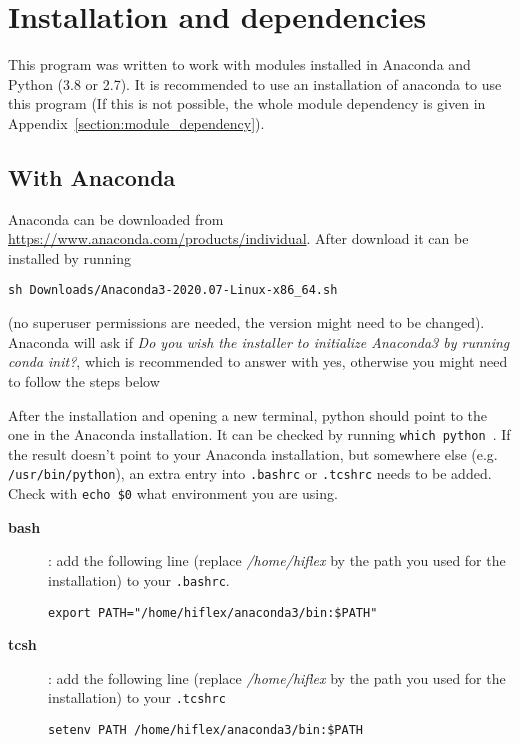 \documentclass[10pt,a4paper]{article}
\begin{document}


\newpage
\section{Installation and dependencies}
\label{Section:installation}

\noindent This program was written to work with modules installed in Anaconda and Python (3.8 or 2.7). It is recommended to use an installation of anaconda to use this program (If this is not possible, the whole module dependency is given in Appendix~\ref{section:module_dependency}).

\subsection{With Anaconda} 
\noindent Anaconda can be downloaded from \url{https://www.anaconda.com/products/individual}. After download it can be installed by running
\begin{lstlisting}[style=base]
sh Downloads/Anaconda3-2020.07-Linux-x86_64.sh
\end{lstlisting}
(no superuser permissions are needed, the version might need to be changed). Anaconda will ask if \textit{Do you wish the installer to initialize Anaconda3 by running conda init?}, which is recommended to answer with yes, otherwise you might need to follow the steps below

After the installation and opening a new terminal, python should point to the one in the Anaconda installation. It can be checked by running \verb|which python|~. %
If the result doesn't point to your Anaconda installation, but somewhere else (e.g. \verb|/usr/bin/python|), an extra entry into \verb|.bashrc| or \verb|.tcshrc| needs to be added. Check with \verb|echo $0| what environment you are using.
\begin{description}
  \item[\textbf{bash}]: add the following line (replace \textit{/home/hiflex} by the path you used for the installation) to your \verb|.bashrc|. %
    \begin{lstlisting}[style=base]
export PATH="/home/hiflex/anaconda3/bin:$PATH"
    \end{lstlisting}
  \item[\textbf{tcsh}]: add the following line (replace \textit{/home/hiflex} by the path you used for the installation) to your \verb|.tcshrc|
    \begin{lstlisting}[style=base]
setenv PATH /home/hiflex/anaconda3/bin:$PATH
    \end{lstlisting}
\end{description}
\end{document}
